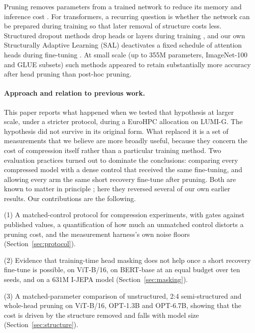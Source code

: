 \documentclass[11pt,a4paper]{article}
\begin{document}
Pruning removes parameters from a trained network to reduce its memory and inference cost \cite{lecun1990obd,hassibi1993obs,han2015learning}. For transformers, a recurring question is whether the network can be prepared during training so that later removal of structure costs less. Structured dropout methods drop heads or layers during training \cite{fan2020layerdrop,zhou2020drophead}, and our own Structurally Adaptive Learning (SAL) deactivates a fixed schedule of attention heads during fine-tuning \cite{martinventi2026salpreprint,martinventi2026ppam}. At small scale (up to 355M parameters, ImageNet-100 and GLUE subsets) such methods appeared to retain substantially more accuracy after head pruning than post-hoc pruning.

\paragraph{Approach and relation to previous work.}
This paper reports what happened when we tested that hypothesis at larger scale, under a stricter protocol, during a EuroHPC allocation on LUMI-G. The hypothesis did not survive in its original form. What replaced it is a set of measurements that we believe are more broadly useful, because they concern the cost of compression itself rather than a particular training method. Two evaluation practices turned out to dominate the conclusions: comparing every compressed model with a dense control that received the same fine-tuning, and allowing every arm the same short recovery fine-tune after pruning. Both are known to matter in principle \cite{blalock2020state,dodge2020finetuning,bouthillier2021variance}; here they reversed several of our own earlier results. Our contributions are the following.

(1) A matched-control protocol for compression experiments, with gates against published values, a quantification of how much an unmatched control distorts a pruning cost, and the measurement harness's own noise floors (Section~\ref{sec:protocol}).

(2) Evidence that training-time head masking does not help once a short recovery fine-tune is possible, on ViT-B/16, on BERT-base at an equal budget over ten seeds, and on a 631M I-JEPA model (Section~\ref{sec:masking}).

(3) A matched-parameter comparison of unstructured, 2:4 semi-structured and whole-head pruning on ViT-B/16, OPT-1.3B and OPT-6.7B, showing that the cost is driven by the structure removed and falls with model size (Section~\ref{sec:structure}).
\end{document}

